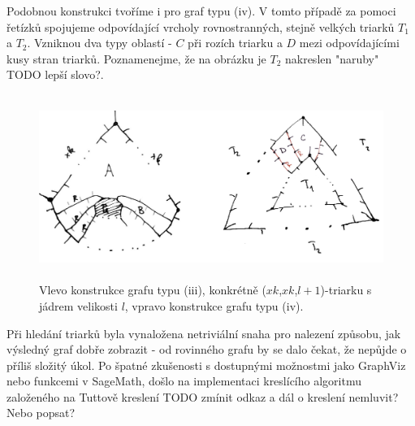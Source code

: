 Podobnou konstrukci tvoříme i pro graf typu (iv). V tomto případě za pomoci řetízků spojujeme odpovídající vrcholy rovnostranných, stejně velkých triarků $T_1$ a $T_2$. Vzniknou dva typy oblastí - $C$ při rozích triarku a $D$ mezi odpovídajícími kusy stran triarků. Poznamenejme, že na obrázku je $T_2$ nakreslen "naruby" TODO lepší slovo?. 


\begin{figure}[h]\centering
\includegraphics[height=60mm]{../img/iii+iv-construction}
\caption{Vlevo konstrukce grafu typu (iii), konkrétně ($xk$,$xk$,$l+1$)-triarku s jádrem velikosti $l$, vpravo konstrukce grafu typu (iv).}
\label{obr03:Nvyber}

\end{figure}

Při hledání triarků byla vynaložena netriviální snaha pro nalezení způsobu, jak výsledný graf dobře zobrazit - od rovinného grafu by se dalo čekat, že nepůjde o příliš složitý úkol. Po špatné zkušenosti s dostupnými možnostmi jako GraphViz nebo funkcemi v SageMath, došlo na implementaci kreslícího algoritmu založeného na Tuttově kreslení TODO zmínit odkaz a dál o kreslení nemluvit? Nebo popsat? 






